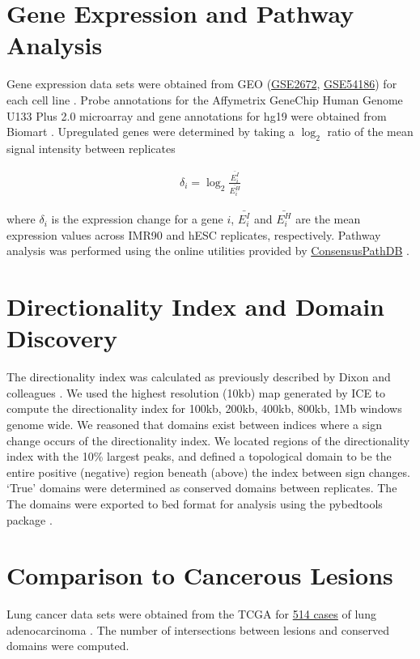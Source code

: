 \section*{Gene Expression and Pathway Analysis}

Gene expression data sets were obtained from \gls{GEO} (\href{http://www.ncbi.nlm.nih.gov/geo/query/acc.cgi?acc=GSE2672}{GSE2672},
\href{http://www.ncbi.nlm.nih.gov/geo/query/acc.cgi?acc=GSE54186}{GSE54186}) for each cell line \citep{kim2005} \citep{kim2014}.  Probe
annotations for the Affymetrix GeneChip Human Genome U133 Plus 2.0 microarray and gene annotations for hg19 were obtained from
Biomart \citep{kasprzyk2011}.  Upregulated genes were determined by taking a $\log_2$ ratio of the mean signal intensity between
replicates

\begin{align}
  \delta_i = \log_2{\frac{\bar{E_i^I}}{\bar{E_i^H}}}
\end{align}

where $\delta_i$ is the expression change for a gene $i$, $\bar{E_i^I}$ and $\bar{E_i^H}$ are the mean expression values across
IMR90 and hESC replicates, respectively.  Pathway analysis was performed using the online utilities provided by
\href{http://consensuspathdb.org/}{ConsensusPathDB} \citep{kamburov2012}.

\section*{Directionality Index and Domain Discovery}

The directionality index was calculated as previously described by Dixon and colleagues \citep{dixon2012}.  We used the highest
resolution (10kb) map generated by \gls{ICE} to compute the directionality index for 100kb, 200kb, 400kb, 800kb, 1Mb windows
genome wide.  We reasoned that domains exist between indices where a sign change occurs of the directionality index.  We located
regions of the directionality index with the 10\% largest peaks, and defined a topological domain to be the entire positive (negative)
region beneath (above) the index between sign changes.   `True' domains were determined as conserved domains between replicates.  The
The domains were exported to \.bed format for analysis using the pybedtools package \citep{quinlan2010,dale2011}.

\section*{Comparison to Cancerous Lesions}

Lung cancer data sets were obtained from the \gls{TCGA} for
\href{https://tcga-data.nci.nih.gov/tcga/tcgaCancerDetails.jsp?diseaseType=LUAD&diseaseName=Lung\%20adenocarcinoma}{514 cases}
of lung adenocarcinoma \citep{cerami2012,gao2013}.  The number of intersections between lesions and conserved domains were computed.

